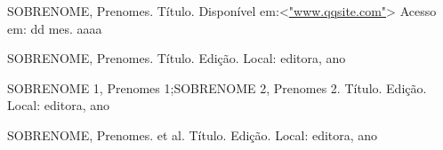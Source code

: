 \begin{thebibliography}{}
 \begin{flushleft}
	SOBRENOME, Prenomes. Título. Disponível em:<\url{"www.qqsite.com"}> Acesso em: dd mes. aaaa
\end{flushleft}
\begin{flushleft}
	SOBRENOME, Prenomes. Título. Edição. Local: editora, ano\\
\end{flushleft}
\begin{flushleft}
	SOBRENOME 1, Prenomes 1;SOBRENOME 2, Prenomes 2. Título. Edição. Local: editora, ano\\
\end{flushleft}
\begin{flushleft}
	SOBRENOME, Prenomes. et al. Título. Edição. Local: editora, ano\\
\end{flushleft}

\end{thebibliography}